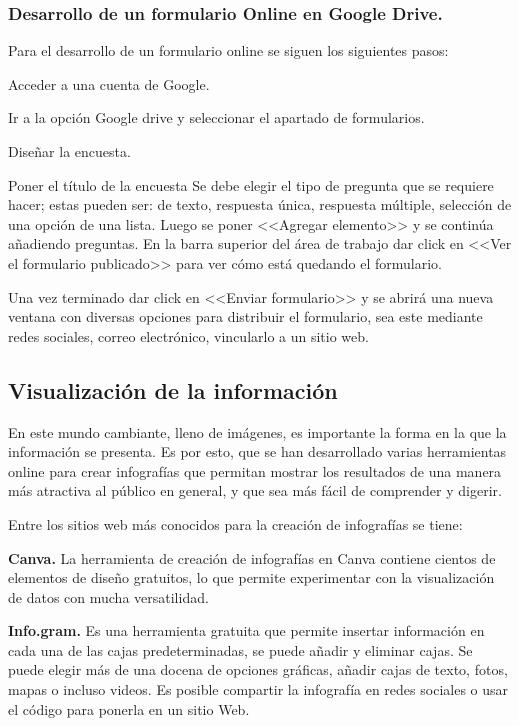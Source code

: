 \documentclass[a5paper,doc,10pt,noapacite]{apa6}
\begin{document}
{{\subsubsection{Desarrollo de un formulario Online en Google Drive.}

Para el desarrollo de un formulario online se siguen los siguientes pasos:

\begin{APAenumerate}
\item Acceder a una cuenta de Google. 
\item Ir a la opción Google drive y seleccionar el apartado de formularios. 
\item Diseñar la encuesta.

\subitem Poner el título de la encuesta 
\subitem Se debe elegir el tipo de pregunta que se requiere hacer; estas pueden ser: de texto, respuesta única, respuesta múltiple, selección de una opción de una lista.
\subitem Luego se poner <<Agregar elemento>> y se continúa añadiendo preguntas. 
\subitem En la barra superior del área de trabajo dar click en <<Ver el formulario publicado>> para ver cómo está quedando el formulario.

\item Una vez terminado dar click en <<Enviar formulario>> y se abrirá una nueva ventana con diversas opciones para distribuir el formulario, sea este mediante redes sociales, correo electrónico, vincularlo a un sitio web. 
\end{APAenumerate}

\subsection{Visualización de la información}
En este mundo cambiante, lleno de imágenes, es importante la forma en la que la información se presenta. Es por esto, que se han desarrollado varias herramientas online para crear infografías que permitan mostrar los resultados de una manera más atractiva al público en general, y que sea más fácil de comprender y digerir.

Entre los sitios web más conocidos para la creación de infografías se tiene:

\vspace{1\baselineskip}
\textbf{Canva.}
La herramienta de creación de infografías en Canva contiene cientos de elementos de diseño  gratuitos, lo que permite experimentar con la visualización de datos con mucha versatilidad.

\textbf{Info.gram.}
Es una herramienta gratuita que permite insertar información en cada una de las cajas predeterminadas, se puede añadir y eliminar cajas. Se puede elegir más de una docena de opciones gráficas, añadir cajas de texto, fotos, mapas o incluso videos. Es posible compartir la infografía en redes sociales o usar el código para ponerla en un sitio Web.

}}
\end{document}
